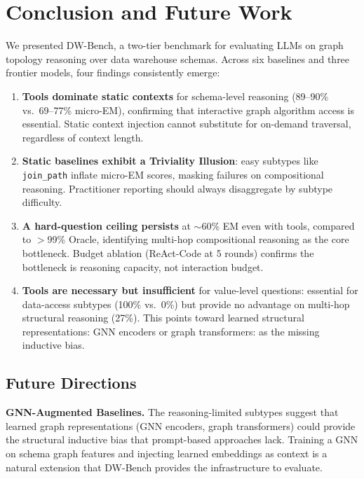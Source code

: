 \section{Conclusion and Future Work}
\label{sec:conclusion}

We presented DW-Bench, a two-tier benchmark for evaluating LLMs on graph
topology reasoning over data warehouse schemas.  Across six baselines and
three frontier models, four findings consistently emerge:

\begin{enumerate}
  \item \textbf{Tools dominate static contexts} for schema-level
    reasoning (89--90\% vs.\ 69--77\% micro-EM), confirming that
    interactive graph algorithm access is essential.  Static context
    injection cannot substitute for on-demand traversal, regardless
    of context length.

  \item \textbf{Static baselines exhibit a Triviality Illusion}: easy
    subtypes like \texttt{join\_path} inflate micro-EM scores, masking
    failures on compositional reasoning.  Practitioner reporting should
    always disaggregate by subtype difficulty.

  \item \textbf{A hard-question ceiling persists} at $\sim$60\% EM even
    with tools, compared to $>$99\% Oracle, identifying multi-hop
    compositional reasoning as the core bottleneck.  Budget ablation
    (ReAct-Code at 5 rounds) confirms the bottleneck is reasoning
    capacity, not interaction budget.

  \item \textbf{Tools are necessary but insufficient} for value-level
    questions: essential for data-access subtypes (100\% vs.\ 0\%) but
    provide no advantage on multi-hop structural reasoning (27\%).
    This points toward learned structural representations: GNN
    encoders or graph transformers: as the missing inductive bias.
\end{enumerate}

\subsection{Future Directions}

\textbf{GNN-Augmented Baselines.}
The reasoning-limited subtypes suggest that learned graph representations
(GNN encoders, graph transformers) could provide the structural inductive
bias that prompt-based approaches lack.  Training a GNN on schema graph
features and injecting learned embeddings as context is a natural
extension that DW-Bench provides the infrastructure to evaluate.

